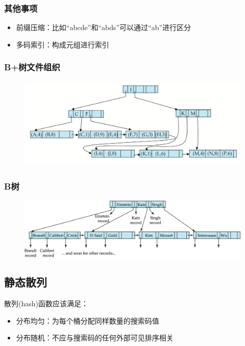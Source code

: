 \subsubsection{其他事项}
\begin{itemize}
	\item 前缀压缩：比如``abcde''和``abds''可以通过``ab''进行区分
	\item 多码索引：构成元组进行索引
\end{itemize}

\subsubsection{B+树文件组织}
\begin{figure}[H]
\centering
\includegraphics[width=0.8\linewidth]{fig/bp-tree_file_organization.png}
\end{figure}

\subsubsection{B树}
\begin{figure}[H]
\centering
\includegraphics[width=0.8\linewidth]{fig/b-tree.png}
\end{figure}

\subsection{静态散列}
散列(hash)函数应该满足：
\begin{itemize}
	\item 分布均匀：为每个桶分配同样数量的搜索码值
	\item 分布随机：不应与搜索码的任何外部可见排序相关
\end{itemize}

